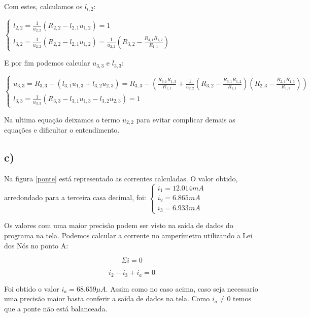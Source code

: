 \documentclass[a4wide]{report}
\begin{document}
Com estes, calculamos os $l_{i,2}$: 

$\begin{cases} 
l_{2,2} = \frac{1}{u_{2,2}}(R_{2,2} - l_{2,1}u_{1,2}) = 1 \\  
l_{3,2} = \frac{1}{u_{2,2}}(R_{2,2} - l_{2,1}u_{1,2}) =  \frac{1}{u_{2,2}}(R_{3,2} - \frac{R_{3,1} R_{1,2}}{R_{1,1}})  
\end{cases} $
 \vspace{1em}

E por fim podemos calcular $u_{3,3}$ e $l_{3,3}$: 

$\begin{cases} 
u_{3,3} = R_{3,3}  - (l_{3,1}u_{1,3} + l_{3,2}u_{2,3}) = R_{3,3} - \left(	\frac{R_{3,1}R_{1,3} }{R_{1,1}} + 	\frac{1}{ u_{2,2} }\left( R_{3,2} - \frac{R_{3,1}R_{1,2}}{R_{1,1}}\right) \left( R_{2,3} - \frac{R_{2,1}R_{1,3}}{R_{1,1}}	\right) 			\right)		 \\  
l_{3,3} = \frac{1}{u_{3,3}}(R_{3,3} - l_{3,1}u_{1,3} -l_{3,2}u_{2,3} ) = 1  
\end{cases} $
 \vspace{1em}

Na ultima equação deixamos o termo $u_{2,2}$ para evitar complicar demais as equações e dificultar o entendimento. 

\subsection*{ c) }
Na figura \ref{ponte} está representado as correntes calculadas. O valor obtido, arredondado para a terceira casa decimal, foi:
$\begin{cases} 
i_1 =  12.014 mA \\  
i_2 = 6.865	mA  \\
i_3 = 6.933 mA
\end{cases} $

Os valores com uma maior precisão podem ser visto na saída de dados do programa na tela. Podemos calcular a corrente no amperímetro utilizando a Lei dos Nós no ponto A:

\begin{equation*}
\Sigma i = 0
\end{equation*}

\begin{equation*}
i_{2} - i_{3} + i_{a} = 0
\end{equation*}

Foi obtido o valor $i_{a} =68.659 \mu A $. Assim como no caso acima, caso seja necessario uma precisão maior basta conferir a saída de dados na tela. Como $i_{a} \neq 0$ temos que a ponte não está balanceada.
\end{document}
